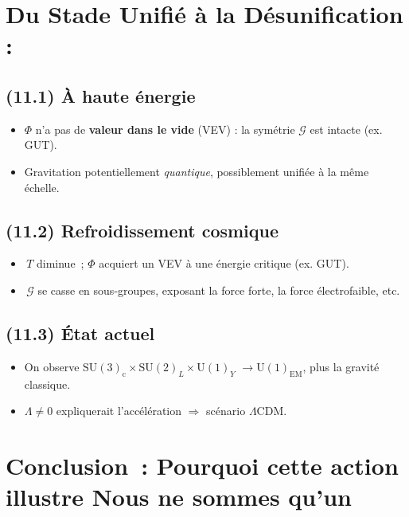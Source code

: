 \documentclass[12pt]{article}
\begin{document}
\section{Du Stade Unifi\'e \`a la D\'esunification :}

\subsection{(11.1) \`A haute \'energie}

\begin{itemize}
\item \(\Phi\) n'a pas de \textbf{valeur dans le vide} (VEV) : la sym\'etrie \(\mathcal{G}\) 
      est intacte (ex. GUT).
\item Gravitation potentiellement \emph{quantique}, possiblement \og unifi\'ee\fg{}
      \`a la m\^eme \'echelle.
\end{itemize}

\subsection{(11.2) Refroidissement cosmique}

\begin{itemize}
\item \(\,T\) diminue~; \(\Phi\) acquiert un VEV \`a une \'energie critique (ex. GUT).
\item \(\,\mathcal{G}\) se \og casse \fg{} en sous-groupes, 
      exposant la force forte, la force \'electrofaible, etc.
\end{itemize}

\subsection{(11.3) \'Etat actuel}

\begin{itemize}
\item On observe \(\mathrm{SU}(3)_\text{c}\times \mathrm{SU}(2)_L\times\mathrm{U}(1)_Y\) 
      \(\to\mathrm{U}(1)_{\mathrm{EM}}\), plus la gravit\'e classique.
\item \(\Lambda\neq0\) expliquerait l'acc\'el\'eration 
      \(\Rightarrow\) sc\'enario \(\Lambda\mathrm{CDM}\).
\end{itemize}

\section{Conclusion~: Pourquoi cette action illustre \og Nous ne sommes qu'un\fg}
\end{document}

